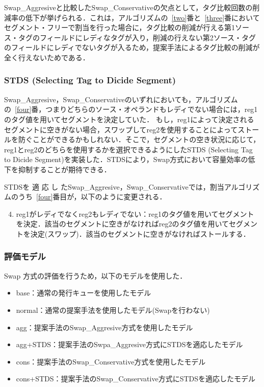 \documentclass[twocolumn]{jsarticle}
\begin{document}
  Swap\_Aggresiveと比較したSwap\_Conservativeの欠点として，タグ比較回数の削減率の低下が挙げられる．これは，アルゴリズムの~\ref{two}番と~\ref{three}番においてセグメント・フリーで割当を行った場合に，タグ比較の削減が行える第1ソース・タグのフィールドにレディなタグが入り，削減の行えない第2ソース・タグのフィールドにレディでないタグが入るため，提案手法によるタグ比較の削減が全く行えないためである．

  \subsubsection{STDS (Selecting Tag to Dicide Segment)}
  Swap\_Aggresive，Swap\_Conservativeのいずれにおいても，アルゴリズムの~\ref{four}番，つまりどちらのソース・オペランドもレディでない場合には，reg1のタグ値を用いてセグメントを決定していた． もし，reg1によって決定されるセグメントに空きがない場合，スワップしてreg2を使用することによってストールを防ぐことができるかもしれない．そこで，セグメントの空き状況に応じて，reg1とreg2のどちらを使用するかを選択できるようにしたSTDS (Selecting Tag to Dicide Segment)を実装した．STDSにより，Swap方式において容量効率の低下を抑制することが期待できる．

  STDSを 適 応 し たSwap\_Aggresive，Swap\_Conservativeでは，割当アルゴリズムのうち~\ref{four}番目が，以下のように変更される．

  \begin{enumerate}
    \setcounter{enumi}{3}
    \item reg1がレディでなくreg2もレディでない：reg1のタグ値を用いてセグメントを決定．該当のセグメントに空きがなければreg2のタグ値を用いてセグメントを決定(スワップ)．該当のセグメントに空きがなければストールする．
  \end{enumerate}
  
  \subsubsection{評価モデル}
  Swap 方式の評価を行うため，以下のモデルを使用した．
  \begin{itemize}
    \item base：通常の発行キューを使用したモデル
    \item normal：通常の提案手法を使用したモデル(Swapを行わない)
    \item agg：提案手法のSwap\_Aggresive方式を使用したモデル
    \item agg+STDS：提案手法のSwpa\_Aggresive方式にSTDSを適応したモデル
    \item cons：提案手法のSwap\_Conservative方式を使用したモデル
    \item cons+STDS：提案手法のSwap\_Conservative方式にSTDSを適応したモデル
  \end{itemize}
\end{document}
